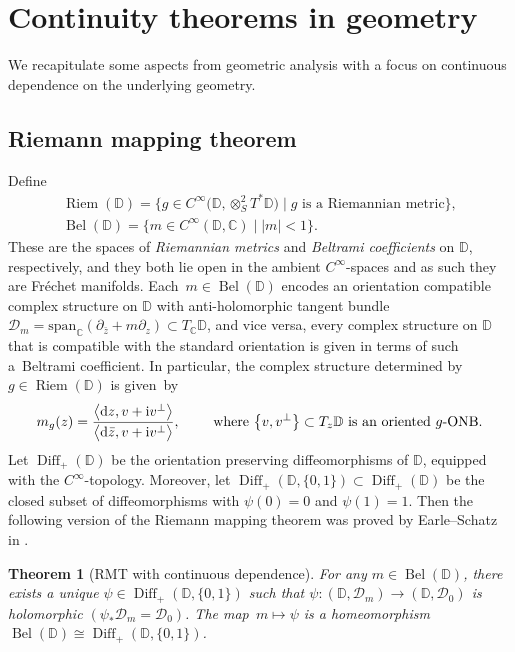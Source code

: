 \documentclass[10pt,a4paper]{amsart}
\numberwithin{equation}{section}
\newtheorem{Theorem}{Theorem}[section]
\theoremstyle{definition}
\newcommand{\C}{\mathbb{C}} %
\newcommand{\DD}{\mathbb{D}} %
\newcommand{\1}{{\bf 1}}
\newcommand{\D}{\mathscr{D}}
\DeclareMathOperator{\Diff}{Diff}
\DeclareMathOperator{\Riem}{Riem}
\DeclareMathOperator{\Bel}{Bel}
\begin{document}
\appendix

\section{Continuity theorems in geometry}\label{s_appa}

We recapitulate some aspects from geometric analysis with a focus on continuous dependence on the underlying geometry.


\subsection{Riemann mapping theorem}\label{s_RMT}
Define
\begin{gather*}
\Riem(\DD)= \big\{g\in C^\infty\bigl(\DD,\otimes_S^2T^*\DD\bigr)\mid g\text{ is a Riemannian metric}\big\},\\
\Bel(\DD) = \{m\in C^\infty(\DD,\C)\mid |m| < 1\}.
\end{gather*}
These are the spaces of {\it Riemannian metrics} and {\it Beltrami coefficients} on $\DD$, respectively, and they both lie open in the ambient $C^\infty$-spaces and as such they are Fr{\'e}chet manifolds. Each~${m\in \Bel(\DD)}$ encodes an orientation compatible complex structure on $\DD$ with anti-holomorphic tangent bundle
$
\D_m = \mathrm{span}_\C(\partial_{\bar z} + m \partial_z)\subset T_\C \DD$,
and vice versa, every complex structure on $\DD$ that is compatible with the standard orientation is given in terms of such a~Beltrami coefficient. In particular, the complex structure determined by $g\in \Riem(\DD)$ is given~by
\begin{equation*}
m_g(z)=\frac{\big\langle {\rm d}z,v+{\rm i}v^\perp\big\rangle}{\big\langle {\rm d}\bar z,v+{\rm i}v^\perp\big\rangle},\qquad \text{ where } \big\{v,v^\perp\big\}\subset T_z \DD \text{ is an oriented $g$-ONB}.
\end{equation*}
 Let $\Diff_+(\DD)$ be the orientation preserving diffeomorphisms of $\DD$, equipped with the $C^\infty$-topology. Moreover, let $\Diff_{+}(\DD,\{0,1\})\subset \Diff_+(\DD)$ be the closed subset of diffeomorphisms with $\psi(0)=0$ and $\psi(1)=1$.
 Then the following version of the Riemann mapping theorem was proved by
 Earle--Schatz in \cite[Theorem on p.~171]{EaSc70}.

\begin{Theorem}[RMT with continuous dependence]\label{RMT}
	For any $m\in \Bel(\DD)$, there exists a unique $\psi\in \Diff_+(\DD,\{0,1\})$ such that $\psi\colon (\DD,\D_m)\rightarrow (\DD,\D_0)$ is holomorphic $(\psi_*\D_m=\D_0)$. The map~${m\mapsto \psi}$ is a homeomorphism $
	\Bel(\DD)\cong \Diff_+(\DD,\{0,1\})$.
\end{Theorem}
\end{document}
